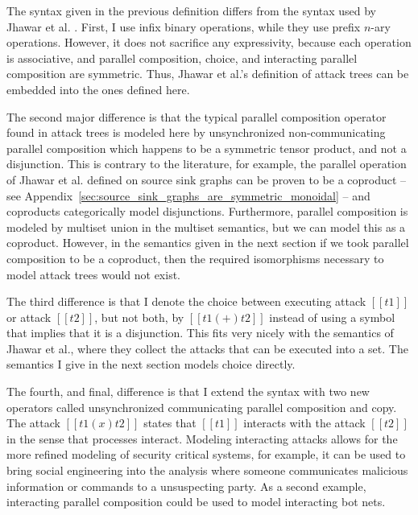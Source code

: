 \documentclass{llncs}
\begin{document}
The syntax given in the previous definition differs from the syntax
used by Jhawar et al. \cite{Jhawar:2015}.  First, I use infix binary
operations, while they use prefix $n$-ary operations. However, it does
not sacrifice any expressivity, because each operation is associative,
and parallel composition, choice, and interacting parallel composition
are symmetric.  Thus, Jhawar et al.'s definition of attack trees can
be embedded into the ones defined here.%

The second major difference is that the typical parallel composition
operator found in attack trees is modeled here by unsynchronized
non-communicating parallel composition which happens to be a symmetric
tensor product, and not a disjunction.  This is contrary to the
literature, for example, the parallel operation of Jhawar et
al. defined on source sink graphs \cite{Jhawar:2015} can be proven to
be a coproduct -- see
Appendix~\ref{sec:source_sink_graphs_are_symmetric_monoidal} -- and
coproducts categorically model disjunctions.  Furthermore, parallel
composition is modeled by multiset union in the multiset semantics,
but we can model this as a coproduct.  However, in the semantics given
in the next section if we took parallel composition to be a coproduct,
then the required isomorphisms necessary to model attack trees would
not exist.

The third difference is that I denote the choice between executing
attack $[[t1]]$ or attack $[[t2]]$, but not both, by $[[t1 (+) t2]]$
instead of using a symbol that implies that it is a disjunction.  This
fits very nicely with the semantics of Jhawar et al., where they
collect the attacks that can be executed into a set.  The semantics I
give in the next section models choice directly.

The fourth, and final, difference is that I extend the syntax with two
new operators called unsynchronized communicating parallel composition
and copy.  The attack $[[t1 (x) t2]]$ states that $[[t1]]$ interacts
with the attack $[[t2]]$ in the sense that processes interact.
Modeling interacting attacks allows for the more refined modeling of
security critical systems, for example, it can be used to bring social
engineering into the analysis where someone communicates malicious
information or commands to a unsuspecting party.  As a second example,
interacting parallel composition could be used to model interacting
bot nets.
\end{document}
